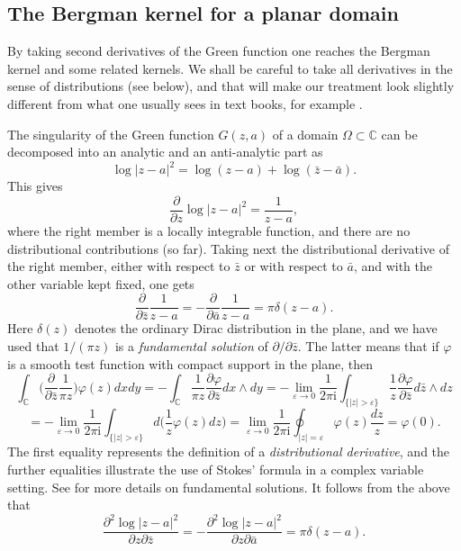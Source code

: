 \documentclass[reqno,12pt]{article}
\theoremstyle{plain}
\theoremstyle{definition}
\numberwithin{equation}{section}
\numberwithin{figure}{section}
\def\I{\mathrm{i}}
\def\C{{\mathbb C}}
\begin{document}

\subsection{The Bergman kernel for a planar domain}\label{sec:Bergman} 

By taking second derivatives of the Green function one reaches the Bergman
kernel and some related kernels. We shall be careful to take all derivatives in the sense of distributions (see below), 
and that will make our treatment look slightly different 
from what one usually sees in text books, for example 
\cite{Bergman-1970, Nehari-1952, Epstein-1965, Hedenmalm-Korenblum-Zhu-2000, Duren-Schuster-2004, Bell-2016}.

The singularity of the Green function $G(z,a)$ of a domain $\Omega\subset\C$ 
can be decomposed into an analytic and an anti-analytic part as
$$
\log|z-a|^2=\log(z-a)+\log(\bar{z}-\bar{a}).
$$
This gives
\begin{equation}\label{residue}
\frac{\partial}{\partial z}\log |z-a|^2=\frac{1}{z-a},
\end{equation}
where the right member is a locally integrable function, and there are  no distributional contributions (so far).
Taking next the distributional derivative of the right member, 
either with respect to $\bar{z}$ or with respect to $\bar{a}$, and with the other variable kept fixed, one gets
$$
\frac{\partial }{\partial \bar{z}}\frac{1}{z-a}=-\frac{\partial}{\partial \bar{a}}\frac{1}{z-a}={\pi} \delta (z-a).
$$
Here $\delta(z)$ denotes the ordinary Dirac distribution in the plane, and we have used that $1/({\pi z})$ is a {\it fundamental solution}
of $\partial/ \partial\bar{z}$.  The latter means that if $\varphi$ is a smooth test function with compact support in the plane, then
$$
\int_\C \big(\frac{\partial}{\partial \bar{z}}\frac{1}{\pi z}\big)\varphi (z)dxdy
=-\int_\C \frac{1}{\pi z}\frac{\partial\varphi}{\partial \bar{z}}dx\wedge dy
=-\lim_{\varepsilon\to 0}\frac{1}{2\pi \I}\int_{\{|z|>\varepsilon\}} \frac{1}{z}\frac{\partial\varphi}{\partial \bar{z}}d\bar{z}\wedge dz
$$
$$
=-\lim_{\varepsilon\to 0}\frac{1}{2\pi \I}\int_{\{|z|>\varepsilon\}} d\Big(\frac{1}{z}\varphi(z) dz\Big)
=\lim_{\varepsilon\to 0}\frac{1}{2\pi \I}\oint_{|z|=\varepsilon} \varphi(z)\frac{dz}{z}=\varphi (0).
$$
The first equality represents the definition of a {\it distributional derivative}, 
and the further equalities illustrate the use of Stokes' formula in a complex variable setting.
See \cite{Treves-1975} for more details on fundamental solutions. It follows from the above that
\begin{equation}\label{d2log}
\frac{\partial^2 \log |z-a|^2}{\partial z \partial \bar{z}}=-\frac{\partial^2 \log |z-a|^2}{\partial z \partial \bar{a}}={\pi}\delta (z-a).
\end{equation}
\end{document}
